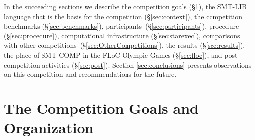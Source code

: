 \documentclass[twoside,11pt]{article}
\begin{document}
In the succeeding sections we describe 
the competition goals (\S\ref{sec:goals}), 
the SMT-LIB language that is the basis for the competition (\S\ref{sec:context}), 
the competition benchmarks (\S\ref{sec:benchmarks}), 
participants~(\S\ref{sec:participants}), 
procedure (\S\ref{sec:procedure}),
computational infrastructure (\S\ref{sec:starexec}), 
comparisons with other competitions~(\S\ref{sec:OtherCompetitions}), 
the results (\S\ref{sec:results}), 
the place of SMT-COMP in the FLoC Olympic Games (\S\ref{sec:floc}), 
and post-competition activities (\S\ref{sec:post}). 
Section \ref{sec:conclusions} presents observations on this competition and recommendations for the future.

\section{The Competition Goals and Organization}
\label{sec:goals}
\end{document}
